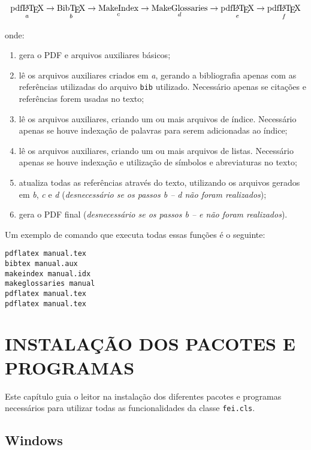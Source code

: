 \documentclass[xindy,rascunho]{fei}
\begin{document}
\begin{teorema}
	\[\operatorname*{\text{pdf\LaTeX}}_a \to \operatorname*{\text{Bib\TeX}}_b \to \operatorname*{\text{MakeIndex}}_c \to \operatorname*{\text{MakeGlossaries}}_d \to \operatorname*{\text{pdf\LaTeX}}_e \to \operatorname*{\text{pdf\LaTeX}}_f\]
	
	onde:
	
	\begin{enumerate}
	\item gera o PDF e arquivos auxiliares básicos;
	\item lê os arquivos auxiliares criados em \emph{a}, gerando a bibliografia apenas com as referências utilizadas do arquivo \texttt{bib} utilizado. Necessário apenas se citações e referências forem usadas no texto;
	\item lê os arquivos auxiliares, criando um ou mais arquivos de índice. Necessário apenas se houve indexação de palavras para serem adicionadas ao índice;
	\item lê os arquivos auxiliares, criando um ou mais arquivos de listas. Necessário apenas se houve indexação e utilização de símbolos e abreviaturas no texto;
	\item atualiza todas as referências através do texto, utilizando os arquivos gerados em \emph{b}, \emph{c} e \emph{d} (\emph{desnecessário se os passos b -- d não foram realizados});
	\item gera o PDF final (\emph{desnecessário se os passos b -- e não foram realizados}).
	\end{enumerate}
	
	Um exemplo de comando que executa todas essas funções é o seguinte:
	
	\begin{verbatim}
pdflatex manual.tex
bibtex manual.aux
makeindex manual.idx
makeglossaries manual
pdflatex manual.tex
pdflatex manual.tex
	\end{verbatim}
	
	\chapter{INSTALAÇÃO DOS PACOTES E PROGRAMAS}	\label{chap:instalacao}
	
	Este capítulo guia o leitor na instalação dos diferentes pacotes e programas necessários para utilizar todas as funcionalidades da classe \texttt{fei.cls}.
	
	\section{Windows}
	

\end{teorema}
\end{document}

